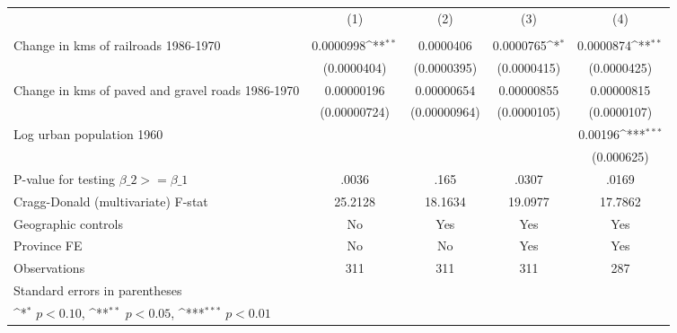 {
\def\sym#1{\ifmmode^{#1}\else\(^{#1}\)\fi}
\begin{tabular}{l*{4}{c}}
\hline\hline
                &\multicolumn{1}{c}{(1)}&\multicolumn{1}{c}{(2)}&\multicolumn{1}{c}{(3)}&\multicolumn{1}{c}{(4)}\\
                &\multicolumn{1}{c}{}&\multicolumn{1}{c}{}&\multicolumn{1}{c}{}&\multicolumn{1}{c}{}\\
\hline
Change in kms of railroads 1986-1970&0.0000998\sym{**} &0.0000406         &0.0000765\sym{*}  &0.0000874\sym{**} \\
                &(0.0000404)         &(0.0000395)         &(0.0000415)         &(0.0000425)         \\
[1em]
Change in kms of paved and gravel roads 1986-1970&0.00000196         &0.00000654         &0.00000855         &0.00000815         \\
                &(0.00000724)         &(0.00000964)         &(0.0000105)         &(0.0000107)         \\
[1em]
Log urban population 1960&                  &                  &                  &  0.00196\sym{***}\\
                &                  &                  &                  &(0.000625)         \\
\hline
P-value for testing $\beta\_{2} >= \beta\_{1}$&    .0036         &     .165         &    .0307         &    .0169         \\
Cragg-Donald (multivariate) F-stat&  25.2128         &  18.1634         &  19.0977         &  17.7862         \\
Geographic controls&       No         &      Yes         &      Yes         &      Yes         \\
Province FE     &       No         &       No         &      Yes         &      Yes         \\
Observations    &      311         &      311         &      311         &      287         \\
\hline\hline
\multicolumn{5}{l}{\footnotesize Standard errors in parentheses}\\
\multicolumn{5}{l}{\footnotesize \sym{*} \(p<0.10\), \sym{**} \(p<0.05\), \sym{***} \(p<0.01\)}\\
\end{tabular}
}
